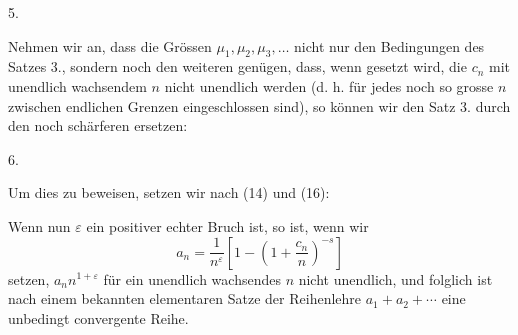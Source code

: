 5. 

Nehmen wir an, dass die Grössen $\mu_1, \mu_2, \mu_3, \ldots$ nicht nur den Bedingungen des Satzes 3., sondern noch den weiteren genügen, dass, wenn
gesetzt wird, die $c_n$ mit unendlich wachsendem $n$ nicht unendlich werden (d. h. für jedes noch so grosse $n$ zwischen endlichen Grenzen eingeschlossen sind), so können wir den Satz 3. durch den noch schärferen ersetzen:

6. 

Um dies zu beweisen, setzen wir nach (14) und (16):

Wenn nun $\varepsilon$ ein positiver echter Bruch ist, so ist, wenn wir
\[
a_n = \frac{1}{n^\varepsilon}\left[1-\left(1+\frac{c_n}{n}\right)^{-s}\right]
\]
setzen, $a_n n^{1+\varepsilon}$ für ein unendlich wachsendes $n$ nicht unendlich, und folglich ist nach einem bekannten elementaren Satze der Reihenlehre $a_1 + a_2 + \cdots$ eine unbedingt convergente Reihe.
